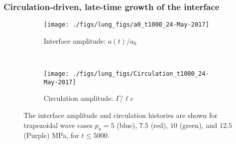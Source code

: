 \documentclass{jfm}%
\begin{document}
\subsubsection{Circulation-driven, late-time growth of the interface}
\begin{figure}
  \centering
  \begin{subfigure}[t]{0.45\textwidth}
    \centering
    \texttt{[image: ./figs/lung\_figs/a0\_t1000\_24-May-2017]}
    \caption{\label{fig:trapz_interface_t1000} Interface amplitude: $a(t)/a_0$}
  \end{subfigure}
  ~
  \begin{subfigure}[t]{0.45\textwidth}
    \centering
    \texttt{[image: ./figs/lung\_figs/Circulation\_t1000\_24-May-2017]}
    \caption{\label{fig:trapz_circ_t1000} Circulation amplitude: $\Gamma/\ell c$}
    \label{fig:trapz_circ_t1000}
  \end{subfigure}
  \caption[The interface amplitude and circulation for long time and
  multiple wave amplitudes]{The interface amplitude
     and circulation
     histories are shown for trapezoidal wave cases 
    $p_a = 5$ (blue), $7.5$ (red), $10$ (green), and $12.5$ (Purple) MPa, for $t \leq 5000$.}
  \label{fig:trapz_interface_acirc}
\end{figure}
\end{document}
